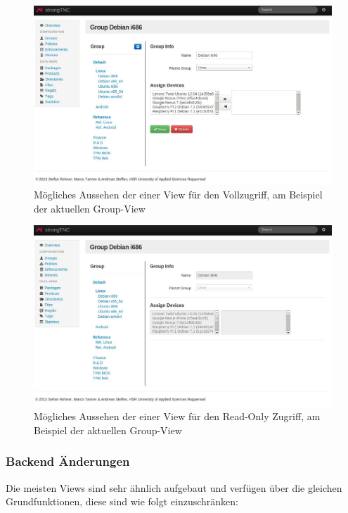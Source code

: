 \begin{figure}[H]
	\centering
	\includegraphics[width=\textwidth]{images/rollen-konzept/group-view-admin.jpg}
	\caption{Mögliches Aussehen der einer View für den Vollzugriff, am Beispiel der aktuellen Group-View}
\end{figure}

\begin{figure}[H]
	\centering
	\includegraphics[width=\textwidth]{images/rollen-konzept/group-view-read-only.jpg}
	\caption{Mögliches Aussehen der einer View für den Read-Only Zugriff, am Beispiel der aktuellen Group-View}
\end{figure}


\subsubsection{Backend Änderungen}

Die meisten Views sind sehr ähnlich aufgebaut und verfügen über die gleichen Grundfunktionen, 
diese sind wie folgt einzuschränken:

